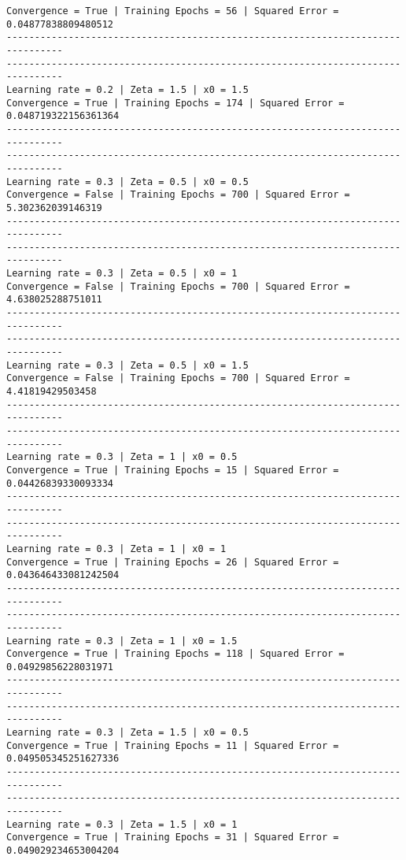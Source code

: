 \documentclass[11pt]{article}
\begin{document}
\begin{Verbatim}[commandchars=\\\{\}]
Convergence = True | Training Epochs = 56 | Squared Error = 0.04877838809480512
--------------------------------------------------------------------------------
--------------------------------------------------------------------------------
Learning rate = 0.2 | Zeta = 1.5 | x0 = 1.5
Convergence = True | Training Epochs = 174 | Squared Error =
0.048719322156361364
--------------------------------------------------------------------------------
--------------------------------------------------------------------------------
Learning rate = 0.3 | Zeta = 0.5 | x0 = 0.5
Convergence = False | Training Epochs = 700 | Squared Error = 5.302362039146319
--------------------------------------------------------------------------------
--------------------------------------------------------------------------------
Learning rate = 0.3 | Zeta = 0.5 | x0 = 1
Convergence = False | Training Epochs = 700 | Squared Error = 4.638025288751011
--------------------------------------------------------------------------------
--------------------------------------------------------------------------------
Learning rate = 0.3 | Zeta = 0.5 | x0 = 1.5
Convergence = False | Training Epochs = 700 | Squared Error = 4.41819429503458
--------------------------------------------------------------------------------
--------------------------------------------------------------------------------
Learning rate = 0.3 | Zeta = 1 | x0 = 0.5
Convergence = True | Training Epochs = 15 | Squared Error = 0.04426839330093334
--------------------------------------------------------------------------------
--------------------------------------------------------------------------------
Learning rate = 0.3 | Zeta = 1 | x0 = 1
Convergence = True | Training Epochs = 26 | Squared Error = 0.043646433081242504
--------------------------------------------------------------------------------
--------------------------------------------------------------------------------
Learning rate = 0.3 | Zeta = 1 | x0 = 1.5
Convergence = True | Training Epochs = 118 | Squared Error = 0.04929856228031971
--------------------------------------------------------------------------------
--------------------------------------------------------------------------------
Learning rate = 0.3 | Zeta = 1.5 | x0 = 0.5
Convergence = True | Training Epochs = 11 | Squared Error = 0.049505345251627336
--------------------------------------------------------------------------------
--------------------------------------------------------------------------------
Learning rate = 0.3 | Zeta = 1.5 | x0 = 1
Convergence = True | Training Epochs = 31 | Squared Error = 0.049029234653004204

\end{Verbatim}
\end{document}
